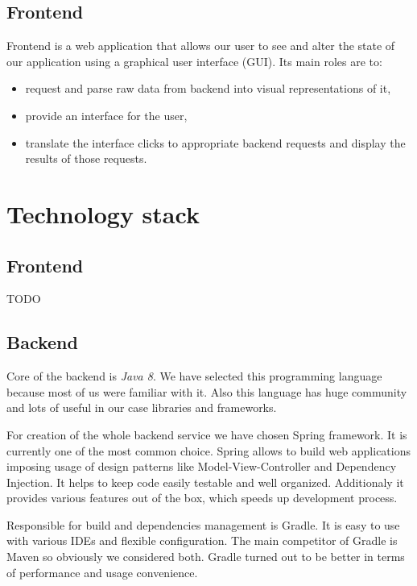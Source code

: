 \documentclass[licencjacka,en]{thesisclass}
\begin{document}
    \subsection{Frontend}
    Frontend is a web application that allows our user to see and alter the state of our application using a graphical user interface (GUI).
    Its main roles are to:
    \begin{itemize}
        \item request and parse raw data from backend into visual representations of it,
        \item provide an interface for the user,
        \item translate the interface clicks to appropriate backend requests and display the results of those requests.
    \end{itemize}

    \section{Technology stack}

    \subsection{Frontend}

    TODO

    \subsection{Backend}

    Core of the backend is \textit{Java 8}. We have selected this programming language because most of us were familiar with it. Also this language has huge community and lots of useful in our case libraries and frameworks.

    For creation of the whole backend service we have chosen Spring framework. It is currently one of the most common choice. Spring allows to build web applications imposing usage of design patterns like Model-View-Controller and Dependency Injection. It helps to keep code easily testable and well organized. Additionaly it provides various features out of the box, which speeds up development process.

    Responsible for build and dependencies management is Gradle. It is easy to use with various IDEs and flexible configuration. The main competitor of Gradle is Maven so obviously we considered both. Gradle turned out to be better in terms of performance and usage convenience.
\end{document}
